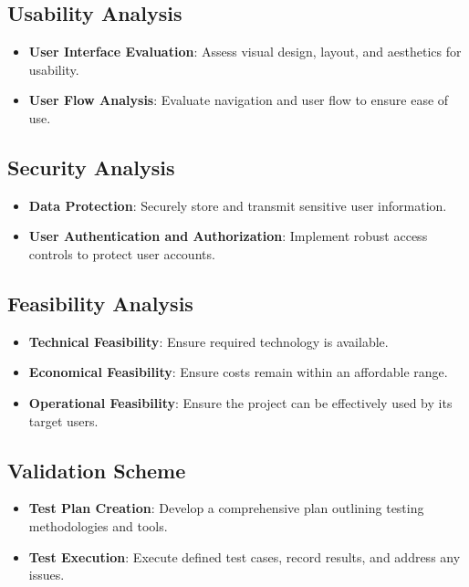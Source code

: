\documentclass[12pt, a4paper, oneside]{article}
\begin{document}
\subsection{Usability Analysis}

\begin{itemize}
  \item \textbf{User Interface Evaluation}: Assess visual design, layout, and aesthetics for usability.
  \item \textbf{User Flow Analysis}: Evaluate navigation and user flow to ensure ease of use.
\end{itemize}

\subsection{Security Analysis}

\begin{itemize}
  \item \textbf{Data Protection}: Securely store and transmit sensitive user information.
  \item \textbf{User Authentication and Authorization}: Implement robust access controls to protect user accounts.
\end{itemize}

\break
\subsection{Feasibility Analysis}

\begin{itemize}
  \item \textbf{Technical Feasibility}: Ensure required technology is available.
  \item \textbf{Economical Feasibility}: Ensure costs remain within an affordable range.
  \item \textbf{Operational Feasibility}: Ensure the project can be effectively used by its target users.
\end{itemize}

\subsection{Validation Scheme}

\begin{itemize}
  \item \textbf{Test Plan Creation}: Develop a comprehensive plan outlining testing methodologies and tools.
  \item \textbf{Test Execution}: Execute defined test cases, record results, and address any issues.
\end{itemize}
\end{document}
